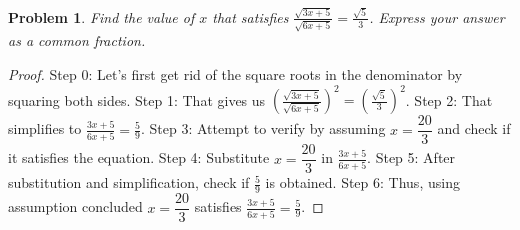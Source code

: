\documentclass{article}
\newtheorem{theorem}{Problem}
\begin{document}
\begin{theorem}
Find the value of $x$ that satisfies $\frac{\sqrt{3x+5}}{\sqrt{6x+5}}=\frac{\sqrt{5}}{3}$. Express your answer as a common fraction.
\end{theorem}

\begin{proof}
Step 0: Let's first get rid of the square roots in the denominator by squaring both sides.
Step 1: That gives us $\displaystyle\left(\frac{\sqrt{3x+5}}{\sqrt{6x+5}}\right)^2=\left(\frac{\sqrt{5}}{3}\right)^2$.
Step 2: That simplifies to $\frac{3x+5}{6x+5}=\frac{5}{9}$.
Step 3: Attempt to verify by assuming $x=\dfrac{20}{3}$ and check if it satisfies the equation.
Step 4: Substitute $x=\dfrac{20}{3}$ in $\frac{3x+5}{6x+5}$.
Step 5: After substitution and simplification, check if $\frac{5}{9}$ is obtained.
Step 6: Thus, using assumption concluded $x=\dfrac{20}{3}$ satisfies $\frac{3x+5}{6x+5}=\frac{5}{9}$.
\end{proof}
\end{document}
